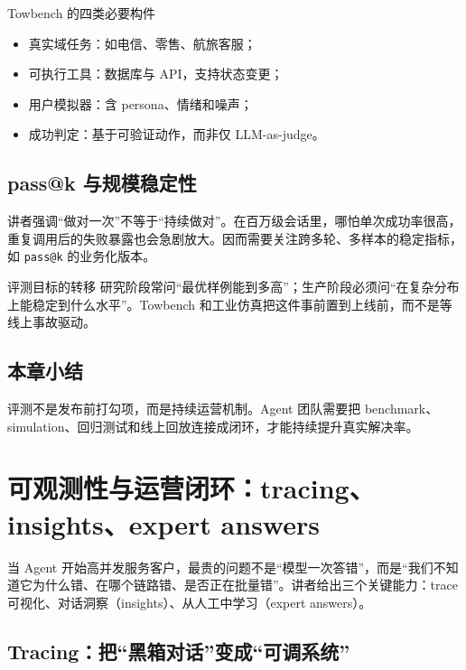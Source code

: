\documentclass[a4paper]{article}
\begin{document}
\begin{knowledgebox}{Towbench 的四类必要构件}
\begin{itemize}[leftmargin=1.5em]
    \item 真实域任务：如电信、零售、航旅客服；
    \item 可执行工具：数据库与 API，支持状态变更；
    \item 用户模拟器：含 persona、情绪和噪声；
    \item 成功判定：基于可验证动作，而非仅 LLM-as-judge。
\end{itemize}
\end{knowledgebox}

\subsection{pass@k 与规模稳定性}

讲者强调“做对一次”不等于“持续做对”。在百万级会话里，哪怕单次成功率很高，重复调用后的失败暴露也会急剧放大。因而需要关注跨多轮、多样本的稳定指标，如 \texttt{pass@k} 的业务化版本。

\begin{importantbox}{评测目标的转移}
研究阶段常问“最优样例能到多高”；生产阶段必须问“在复杂分布上能稳定到什么水平”。Towbench 和工业仿真把这件事前置到上线前，而不是等线上事故驱动。
\end{importantbox}

\subsection{本章小结}

评测不是发布前打勾项，而是持续运营机制。Agent 团队需要把 benchmark、simulation、回归测试和线上回放连接成闭环，才能持续提升真实解决率。

\section{可观测性与运营闭环：tracing、insights、expert answers}

当 Agent 开始高并发服务客户，最贵的问题不是“模型一次答错”，而是“我们不知道它为什么错、在哪个链路错、是否正在批量错”。讲者给出三个关键能力：trace 可视化、对话洞察（insights）、从人工中学习（expert answers）。

\subsection{Tracing：把“黑箱对话”变成“可调系统”}
\end{document}
